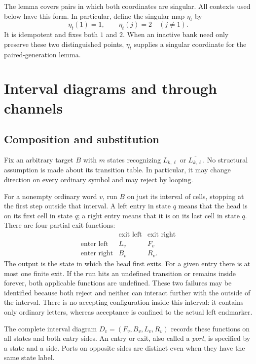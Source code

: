 \documentclass[11pt,a4paper]{article}
\theoremstyle{definition}
\theoremstyle{remark}
\begin{document}
The lemma covers pairs in which both coordinates are singular.
All contexts used below have this form. In particular, define the
singular map $\eta_t$ by
\[
 \eta_t(1)=1,\qquad \eta_t(j)=2\quad(j\ne1).
\]
It is idempotent and fixes both $1$ and $2$. When an inactive bank need
only preserve these two distinguished points, $\eta_t$ supplies a
singular coordinate for the paired-generation lemma.

\section{Interval diagrams and through channels}\label{sec:diagrams}

\subsection{Composition and substitution}

Fix an arbitrary target $B$ with $m$ states recognizing
$L_{k,\ell}$ or $\overline{L_{k,\ell}}$. No structural assumption is made about its
transition table. In particular, it may change direction on every
ordinary symbol and may reject by looping.

For a nonempty ordinary word $v$, run $B$ on just its interval of
cells, stopping at the first step outside that interval. A left entry
in state $q$ means that the head is on its first cell in state $q$;
a right entry means that it is on its last cell in state $q$. There
are four partial exit functions:
\begin{equation}\label{eq:exit-table}
 \begin{array}{c|cc}
       &\text{exit left}&\text{exit right}\\\hline
 \text{enter left}&L_v&F_v\\
 \text{enter right}&B_v&R_v.
 \end{array}
\end{equation}
The output is the state in which the head first exits. For a given
entry there is at most one finite exit. If the run hits an undefined
transition or remains inside forever, both applicable functions are
undefined. These two failures may be identified because both reject
and neither can interact further with the outside of the interval.
There is no accepting configuration inside this interval: it contains
only ordinary letters, whereas acceptance is confined to the actual
left endmarker.

The complete interval diagram $D_v=(F_v,B_v,L_v,R_v)$ records these
functions on all states and both entry sides. An entry or exit, also called a \emph{port}, is specified by a state
and a side. Ports on opposite sides are distinct even when they have
the same state label.
\end{document}
